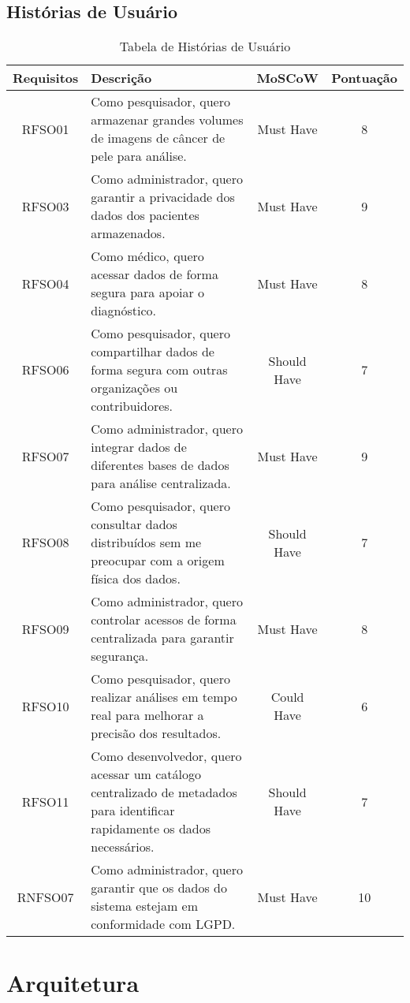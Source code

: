 \subsection{Histórias de Usuário}
\begin{table}[H]
    \centering
    \begin{tabular}{|c|p{8cm}|c|c|}
    \hline
    \textbf{Requisitos} & \textbf{Descrição} & \textbf{MoSCoW} & \textbf{Pontuação} \\ \hline
    RFSO01 & Como pesquisador, quero armazenar grandes volumes de imagens de câncer de pele para análise. & Must Have & 8 \\ \hline
    RFSO03 & Como administrador, quero garantir a privacidade dos dados dos pacientes armazenados. & Must Have & 9 \\ \hline
    RFSO04 & Como médico, quero acessar dados de forma segura para apoiar o diagnóstico. & Must Have & 8 \\ \hline
    RFSO06 & Como pesquisador, quero compartilhar dados de forma segura com outras organizações ou contribuidores. & Should Have & 7 \\ \hline
    RFSO07 & Como administrador, quero integrar dados de diferentes bases de dados para análise centralizada. & Must Have & 9 \\ \hline
    RFSO08 & Como pesquisador, quero consultar dados distribuídos sem me preocupar com a origem física dos dados. & Should Have & 7 \\ \hline
    RFSO09 & Como administrador, quero controlar acessos de forma centralizada para garantir segurança. & Must Have & 8 \\ \hline
    RFSO10 & Como pesquisador, quero realizar análises em tempo real para melhorar a precisão dos resultados. & Could Have & 6 \\ \hline
    RFSO11 & Como desenvolvedor, quero acessar um catálogo centralizado de metadados para identificar rapidamente os dados necessários. & Should Have & 7 \\ \hline
    RNFSO07 & Como administrador, quero garantir que os dados do sistema estejam em conformidade com LGPD. & Must Have & 10 \\ \hline
    \end{tabular}
    \caption{Tabela de Histórias de Usuário}
    \label{tab:historias_usuario}
\end{table}

\section{Arquitetura}

